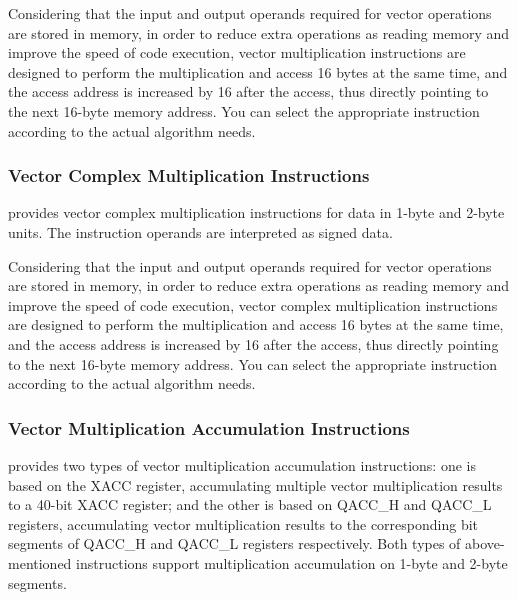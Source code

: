 \documentclass[main\_\_EN.tex]{subfiles}
\begin{document}
Considering that the input and output operands required for vector operations are stored in memory, in order to reduce extra operations as reading memory and improve the speed of code execution, vector multiplication instructions are designed to perform the multiplication and access 16 bytes at the same time, and the access address is increased by 16 after the access, thus directly pointing to the next 16-byte memory address. You can select the appropriate instruction according to the actual algorithm needs.




\subsubsection{Vector Complex Multiplication Instructions}

\chipname{} provides vector complex multiplication instructions for data in 1-byte and 2-byte units. The instruction operands are interpreted as signed data.

Considering that the input and output operands required for vector operations are stored in memory, in order to reduce extra operations as reading memory and improve the speed of code execution, vector complex multiplication instructions are designed to perform the multiplication and access 16 bytes at the same time, and the access address is increased by 16 after the access, thus directly pointing to the next 16-byte memory address. You can select the appropriate instruction according to the actual algorithm needs.




\subsubsection{Vector Multiplication Accumulation Instructions}

\chipname{} provides two types of vector multiplication accumulation instructions: one is based on the XACC register, accumulating multiple vector multiplication results to a 40-bit XACC register; and the other is based on QACC\_H and QACC\_L registers, accumulating vector multiplication results to the corresponding bit segments of QACC\_H and QACC\_L registers respectively. Both types of above-mentioned instructions support multiplication accumulation on 1-byte and 2-byte segments.
\end{document}

